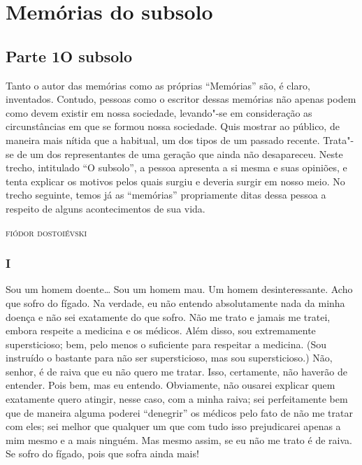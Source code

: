 \part{Memórias do subsolo}

\chapter[Parte 1 --- O subsolo]{Parte 1\break O subsolo}

\epigraph{Tanto o autor das memórias como as próprias “Memórias” são, é claro,
inventados. Contudo, pessoas como o escritor dessas memórias não apenas podem
como devem existir em nossa sociedade, levando"-se em consideração as
circunstâncias em que se formou nossa sociedade. Quis mostrar ao público, de
maneira mais nítida que a habitual, um dos tipos de um passado recente.
Trata"-se de um dos representantes de uma geração que ainda não desapareceu.
Neste trecho, intitulado “O subsolo”, a pessoa apresenta a si mesma e suas
opiniões, e tenta explicar os motivos pelos quais surgiu e deveria surgir em
nosso meio. No trecho seguinte, temos já as “memórias” propriamente ditas dessa
pessoa a respeito de alguns acontecimentos de sua vida.}{\textsc{fiódor dostoiévski}}

\medskip

\section{I}

Sou um homem doente\ldots{} Sou um homem mau. Um homem desinteressante. Acho
que sofro do fígado. Na verdade, eu não entendo absolutamente nada da
minha doença e não sei exatamente do que sofro. Não me trato e jamais
me tratei, embora respeite a medicina e os médicos. Além disso, sou
extremamente supersticioso; bem, pelo menos o suficiente para respeitar
a medicina. (Sou instruído o bastante para não ser supersticioso, mas
sou supersticioso.) Não, senhor, é de raiva que eu não quero me tratar.
Isso, certamente, não haverão de entender. Pois bem, mas eu entendo.
Obviamente, não ousarei explicar quem exatamente quero atingir, nesse
caso, com a minha raiva; sei perfeitamente bem que de maneira alguma
poderei “denegrir” os médicos pelo fato de não me tratar com eles; sei
melhor que qualquer um que com tudo isso prejudicarei apenas a mim
mesmo e a mais ninguém. Mas mesmo assim, se eu não me trato é de raiva.
Se sofro do fígado, pois que sofra ainda mais!

